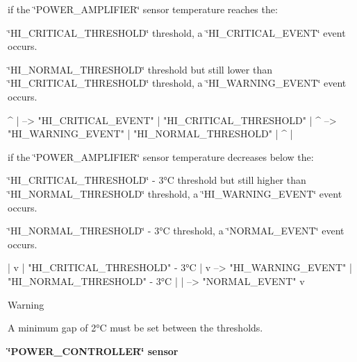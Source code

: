 if the \char`\"{}\+P\+O\+W\+E\+R\+\_\+\+A\+M\+P\+L\+I\+F\+I\+E\+R\char`\"{} sensor temperature reaches the\+:
\begin{DoxyItemize}
\item \char`\"{}\+H\+I\+\_\+\+C\+R\+I\+T\+I\+C\+A\+L\+\_\+\+T\+H\+R\+E\+S\+H\+O\+L\+D\char`\"{} threshold, a \char`\"{}\+H\+I\+\_\+\+C\+R\+I\+T\+I\+C\+A\+L\+\_\+\+E\+V\+E\+N\+T\char`\"{} event occurs.
\item \char`\"{}\+H\+I\+\_\+\+N\+O\+R\+M\+A\+L\+\_\+\+T\+H\+R\+E\+S\+H\+O\+L\+D\char`\"{} threshold but still lower than \char`\"{}\+H\+I\+\_\+\+C\+R\+I\+T\+I\+C\+A\+L\+\_\+\+T\+H\+R\+E\+S\+H\+O\+L\+D\char`\"{} threshold, a \char`\"{}\+H\+I\+\_\+\+W\+A\+R\+N\+I\+N\+G\+\_\+\+E\+V\+E\+N\+T\char`\"{} event occurs.
\end{DoxyItemize}

\begin{DoxyVerb}      ^
      |           --> "HI_CRITICAL_EVENT"
      |
 "HI_CRITICAL_THRESHOLD"
      |
      ^           --> "HI_WARNING_EVENT"
      |
 "HI_NORMAL_THRESHOLD"
      |
      ^
      |
\end{DoxyVerb}


if the \char`\"{}\+P\+O\+W\+E\+R\+\_\+\+A\+M\+P\+L\+I\+F\+I\+E\+R\char`\"{} sensor temperature decreases below the\+:
\begin{DoxyItemize}
\item \char`\"{}\+H\+I\+\_\+\+C\+R\+I\+T\+I\+C\+A\+L\+\_\+\+T\+H\+R\+E\+S\+H\+O\+L\+D\char`\"{} -\/ 3°C threshold but still higher than \char`\"{}\+H\+I\+\_\+\+N\+O\+R\+M\+A\+L\+\_\+\+T\+H\+R\+E\+S\+H\+O\+L\+D\char`\"{} threshold, a \char`\"{}\+H\+I\+\_\+\+W\+A\+R\+N\+I\+N\+G\+\_\+\+E\+V\+E\+N\+T\char`\"{} event occurs.
\item \char`\"{}\+H\+I\+\_\+\+N\+O\+R\+M\+A\+L\+\_\+\+T\+H\+R\+E\+S\+H\+O\+L\+D\char`\"{} -\/ 3°C threshold, a \char`\"{}\+N\+O\+R\+M\+A\+L\+\_\+\+E\+V\+E\+N\+T\char`\"{} event occurs.
\end{DoxyItemize}

\begin{DoxyVerb}      |
      v
      |
 "HI_CRITICAL_THRESHOLD" - 3°C
      |
      v           --> "HI_WARNING_EVENT"
      |
 "HI_NORMAL_THRESHOLD" - 3°C
      |
      |           --> "NORMAL_EVENT"
      v
\end{DoxyVerb}


\begin{DoxyWarning}{Warning}

\begin{DoxyItemize}
\item A minimum gap of 2°C must be set between the thresholds.
\end{DoxyItemize}
\end{DoxyWarning}
{\bfseries \char`\"{}\+P\+O\+W\+E\+R\+\_\+\+C\+O\+N\+T\+R\+O\+L\+L\+E\+R\char`\"{} sensor}

